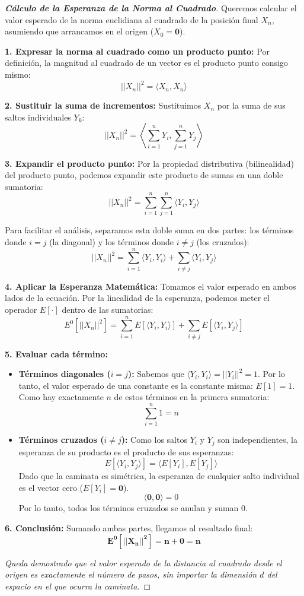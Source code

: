 \documentclass[10pt,a4paper]{article}
\begin{document}
\begin{proof}[\textbf{Cálculo de la Esperanza de la Norma al Cuadrado}]
    Queremos calcular el valor esperado de la norma euclidiana al cuadrado de la posición final $X_n$, asumiendo que arrancamos en el origen ($X_0 = \mathbf{0}$).
    
    \textbf{1. Expresar la norma al cuadrado como un producto punto:}
    Por definición, la magnitud al cuadrado de un vector es el producto punto consigo mismo:
    \[ ||X_n||^2 = \langle X_n, X_n \rangle \]
    
    \textbf{2. Sustituir la suma de incrementos:}
    Sustituimos $X_n$ por la suma de sus saltos individuales $Y_k$:
    \[ ||X_n||^2 = \left\langle \sum_{i=1}^n Y_i, \sum_{j=1}^n Y_j \right\rangle \]
    
    \textbf{3. Expandir el producto punto:}
    Por la propiedad distributiva (bilinealidad) del producto punto, podemos expandir este producto de sumas en una doble sumatoria:
    \[ ||X_n||^2 = \sum_{i=1}^n \sum_{j=1}^n \langle Y_i, Y_j \rangle \]
    
    Para facilitar el análisis, separamos esta doble suma en dos partes: los términos donde $i = j$ (la diagonal) y los términos donde $i \neq j$ (los cruzados):
    \[ ||X_n||^2 = \sum_{i=1}^n \langle Y_i, Y_i \rangle + \sum_{i \neq j} \langle Y_i, Y_j \rangle \]
    
    \textbf{4. Aplicar la Esperanza Matemática:}
    Tomamos el valor esperado en ambos lados de la ecuación. Por la linealidad de la esperanza, podemos meter el operador $E[\cdot]$ dentro de las sumatorias:
    \[ E^0[||X_n||^2] = \sum_{i=1}^n E[\langle Y_i, Y_i \rangle] + \sum_{i \neq j} E[\langle Y_i, Y_j \rangle] \]
    
    \textbf{5. Evaluar cada término:}
    \begin{itemize}
        \item \textbf{Términos diagonales ($i = j$):} Sabemos que $\langle Y_i, Y_i \rangle = ||Y_i||^2 = 1$. Por lo tanto, el valor esperado de una constante es la constante misma: $E[1] = 1$.
        Como hay exactamente $n$ de estos términos en la primera sumatoria:
        \[ \sum_{i=1}^n 1 = n \]
        
        \item \textbf{Términos cruzados ($i \neq j$):} Como los saltos $Y_i$ y $Y_j$ son independientes, la esperanza de su producto es el producto de sus esperanzas:
        \[ E[\langle Y_i, Y_j \rangle] = \langle E[Y_i], E[Y_j] \rangle \]
        Dado que la caminata es simétrica, la esperanza de cualquier salto individual es el vector cero ($E[Y_i] = \mathbf{0}$). 
        \[ \langle \mathbf{0}, \mathbf{0} \rangle = 0 \]
        Por lo tanto, todos los términos cruzados se anulan y suman $0$.
    \end{itemize}
    
    \textbf{6. Conclusión:}
    Sumando ambas partes, llegamos al resultado final:
    \[ \mathbf{E^0[||X_n||^2] = n + 0 = n} \]
    
    \textit{Queda demostrado que el valor esperado de la distancia al cuadrado desde el origen es exactamente el número de pasos, sin importar la dimensión $d$ del espacio en el que ocurra la caminata.}
\end{proof}
\end{document}
